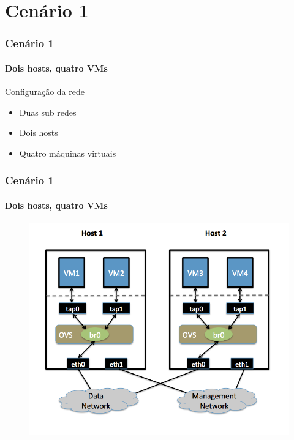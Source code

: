 \documentclass[12pt]{beamer}
\begin{document}
\section{Cenário 1}
\begin{frame}
  \frametitle{Cenário 1}
  \framesubtitle{Dois hosts, quatro VMs}
  \begin{block}{Configuração da rede}
  \begin{itemize}
    \pause
    \item Duas sub redes
    \pause
    \item Dois hosts
    \pause
    \item Quatro máquinas virtuais
  \end{itemize}
  \end{block}
\end{frame}

\begin{frame}
  \frametitle{Cenário 1}
  \framesubtitle{Dois hosts, quatro VMs}
  \begin{figure}[t]
      \includegraphics[width=.75\textwidth]{2host-4vm}
      \centering
  \end{figure}
\end{frame}
\end{document}
